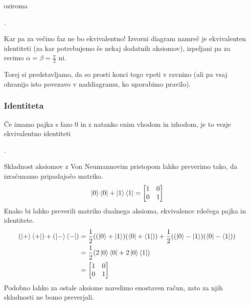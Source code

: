 \documentclass[mat1]{fmfdelo}
\begin{document}
oziroma 
\begin{center}
    .
\end{center}
Kar pa za večino faz ne bo ekvivalentno! Izvorni diagram namreč je ekvivalenten identiteti (za kar potrebujemo še nekaj dodatnih aksiomov), izpeljani pa za recimo \(\alpha = \beta = \frac\pi2\) ni.

Torej si predstavljamo, da so prosti konci togo vpeti v ravnino (ali pa vsaj ohranijo isto povezavo v naddiagramu, ko uporabimo pravilo).
\subsubsection{Identiteta} \label{identiteta}
Če imamo pajka s fazo \(0\) in z natanko enim vhodom in izhodom, je to vezje ekvivalentno identiteti
\begin{center}
    .
\end{center}
Skladnost aksiomov z Von Neumannovim pristopom lahko preverimo tako, da izračunamo pripadajočo matriko.
\begin{align*}
    \ket0\bra0 + \ket1\bra1 = \begin{bmatrix}
        1&0\\0&1
    \end{bmatrix}
\end{align*}
Enako bi lahko preverili matriko dualnega aksioma, ekvivalence rdečega pajka in identitete.
\begin{align*}
    (\ket+\bra+) +(\ket-\bra-)&=
    \frac{1}{2} ((\ket0+\ket1)(\bra0 + \bra1)) + \frac{1}{2}((\ket0-\ket1)(\bra0 - \bra1))\\
    &=\frac{1}{2} (2\ket0\bra0 + 2\ket0\bra1)\\
    &=\begin{bmatrix}
        1&0\\0&1
    \end{bmatrix}
\end{align*}
Podobno lahko za ostale aksiome naredimo enostaven račun, zato za njih skladnosti ne bomo preverjali.
\end{document}
